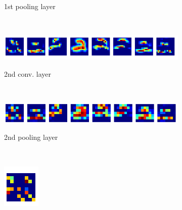 \begin{frame}[plain]
\begin{figure}
\begin{subfigure}{0.6\textwidth}
\end{subfigure}
\begin{subfigure}{0.3\textwidth}
\caption*{1st pooling layer}
\end{subfigure}
\\
\begin{subfigure}{0.6\textwidth}
\includegraphics[width=\textwidth]{cnn_3_conv}
\end{subfigure}
\begin{subfigure}{0.3\textwidth}
\caption*{2nd conv. layer}
\end{subfigure}
\\
\begin{subfigure}{0.6\textwidth}
\includegraphics[width=\textwidth]{cnn_2_pool}
\end{subfigure}
\begin{subfigure}{0.3\textwidth}
\caption*{2nd pooling layer}
\end{subfigure}
\\
\begin{subfigure}{0.1\textwidth}
\includegraphics[width=\textwidth]{cnn_hidden}

\end{subfigure}
\end{figure}
\end{frame}
